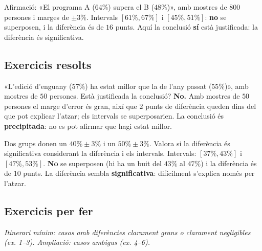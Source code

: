 \begin{exemple}
Afirmació: «El programa A ($64\%$) supera el B ($48\%$)», amb mostres de $800$ persones i
marges de $\pm 3\%$. Intervals $[61\%,67\%]$ i $[45\%,51\%]$: \textbf{no} se superposen, i
la diferència és de $16$ punts. Aquí la conclusió \textbf{sí} està justificada: la
diferència és significativa.
\end{exemple}

\subsection{Exercicis resolts}

\begin{exresolt}
«L'edició d'enguany ($57\%$) ha estat millor que la de l'any passat ($55\%$)», amb mostres
de $50$ persones. Està justificada la conclusió?
\solucio
\textbf{No.} Amb mostres de $50$ persones el marge d'error és gran, així que $2$ punts de
diferència queden dins del que pot explicar l'atzar; els intervals se superposarien. La
conclusió és \textbf{precipitada}: no es pot afirmar que hagi estat millor.
\end{exresolt}

\begin{exresolt}
Dos grups donen un $40\%\pm 3\%$ i un $50\%\pm 3\%$. Valora si la diferència és
significativa considerant la diferència i els intervals.
\solucio
Intervals: $[37\%,43\%]$ i $[47\%,53\%]$. \textbf{No} se superposen (hi ha un buit del
$43\%$ al $47\%$) i la diferència és de $10$ punts. La diferència sembla
\textbf{significativa}: difícilment s'explica només per l'atzar.
\end{exresolt}

\subsection{Exercicis per fer}

\noindent\textit{Itinerari mínim: casos amb diferències clarament grans o clarament
negligibles (ex. 1--3). Ampliació: casos ambigus (ex. 4--6).}

